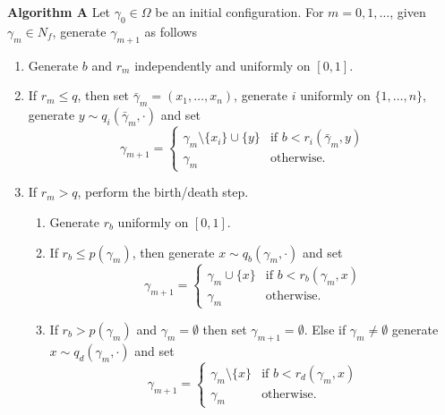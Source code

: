 \noindent \textbf{Algorithm A}\newline
\noindent Let $\gamma_0 \in \Omega$ be an initial configuration. 
For $m=0,1,\dots$, given $\gamma_m \in N_f$, generate $\gamma_{m+1}$ as follows
\begin{enumerate} 
	\item Generate $b$ and $r_m$ independently and uniformly on $[0,1]$.
	\item If $r_m \leq q$, then set $\bar\gamma_m=(x_1,\dots, x_n)$, generate $i$ uniformly on $\{1,\dots, n\}$, generate $y \sim q_i(\bar \gamma_m,\cdot)$ and set 
		\begin{equation}
		\gamma_{m+1} = 
		\left\{
		    \begin{array}{ll}
			\gamma_m \setminus\{x_i\}\cup \{y\} & \mbox{if }  b < r_i(\bar\gamma_m,y)\\ 
			\gamma_m & \mbox{otherwise. }
		    \end{array}
		\right. 
		\end{equation}
	\item If $r_m > q$, perform the birth/death step. 
	\begin{enumerate}
		\item Generate $r_{b}$ uniformly on $[0,1]$.
		    \item If $r_{b}\leq p(\gamma_m)$, then generate $x\sim q_b(\gamma_m,\cdot)$ and set
			\begin{equation}
			\gamma_{m+1} = 
			\left\{
			    \begin{array}{ll}
				\gamma_m \cup \{x\} & \mbox{if }  b < r_b(\gamma_m, x) \\
				\gamma_m & \mbox{otherwise. }
			    \end{array}
			\right. 
			\end{equation}
		    \item If $r_{b}>p(\gamma_m)$ and $\gamma_m=\emptyset$ then set $\gamma_{m+1}=\emptyset$. Else if $\gamma_m\neq\emptyset$ generate $x\sim q_d(\gamma_m,\cdot)$ and set
			\begin{equation}
			\gamma_{m+1} = 
			\left\{
			    \begin{array}{ll}
				\gamma_m \setminus \{x\} & \mbox{if }  b < r_d(\gamma_m, x) \\ 
				\gamma_m & \mbox{otherwise. }
			    \end{array}
			\right. 
			\end{equation}
	\end{enumerate}
\end{enumerate}

